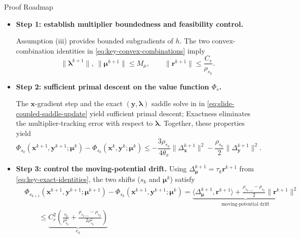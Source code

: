\documentclass[handout,compress,9pt]{beamer}
\newcommand{\red}[1]{\textcolor{ddlred}{#1}}
\newcommand{\bx}{\bm{x}}
\newcommand{\by}{\bm{y}}
\newcommand{\br}{\bm{r}}
\newcommand{\bmu}{\bm{\mu}}
\newcommand{\blmbd}{\bm{\lambda}}
\begin{document}
\begin{frame}{Proof Roadmap}
\scriptsize
\vspace{0.1cm}
\begin{itemize}
\setlength{\itemsep}{0.20cm}

\item[\red{$\blacktriangleright$}]
\textbf{Step 1: establish multiplier boundedness and feasibility control.}

Assumption (iii) provides bounded subgradients of $h$.
The two convex-combination identities in
\eqref{eq:key-convex-combinations} imply
\begin{equation*}
  \|\blmbd^{k+1}\|,\ \|\bmu^{k+1}\|\le M_\mu,
  \qquad
  \|\br^{k+1}\|\le \frac{C_r}{\rho_{s_k}}.
\end{equation*}

\item[\red{$\blacktriangleright$}]
\textbf{Step 2: sufficient primal descent on the value function $\Phi_s$.}

The $\bx$-gradient step and the exact $(\by,\blmbd)$ saddle solve in in \eqref{eq:slide-coupled-saddle-update} yield
sufficient primal descent; \red{Exactness eliminates the multiplier-tracking error with respect to $\blmbd$.} Together, these properties yield
\begin{equation*}
  \Phi_{s_k}(\bx^{k+1},\by^{k+1};\bmu^k)
  -\Phi_{s_k}(\bx^k,\by^k;\bmu^k)
  \le -\frac{3\rho_{s_k}}{4\theta_x}\|\Delta_{\bx}^{k+1}\|^2
  -\frac{\rho_{s_k}}{2}\|\Delta_{\by}^{k+1}\|^2.
\end{equation*}
\vspace{-0.22cm}

\item[\red{$\blacktriangleright$}]
\textbf{Step 3: control the moving-potential drift.}
Using $\Delta_{\bmu}^{k+1}=\tau_k\br^{k+1}$ from
\eqref{eq:key-exact-identities}, the two shifts ($s_k$ and $\bmu^k$) satisfy
\vspace{-0.08cm}
\begin{equation*}
\begin{aligned}
  &\Phi_{s_{k+1}}(\bx^{k+1},\by^{k+1};\bmu^{k+1})
  -\Phi_{s_k}(\bx^{k+1},\by^{k+1};\bmu^k) = 
  \underbrace{\langle\Delta_{\bmu}^{k+1},\br^{k+1}\rangle
  +\frac{\rho_{s_{k+1}}-\rho_{s_k}}{2}\|\br^{k+1}\|^2}_{\text{moving-potential drift}}\\
  &\qquad\le
  \underbrace{C_r^2\!\left(
  \frac{\tau_k}{\rho_{s_k}^2}
  +\frac{\rho_{s_{k+1}}-\rho_{s_k}}{2\rho_{s_k}^2}
  \right)}_{e_k}
\end{aligned}
\end{equation*}
\vspace{-0.08cm}


\end{itemize}
\end{frame}
\end{document}
